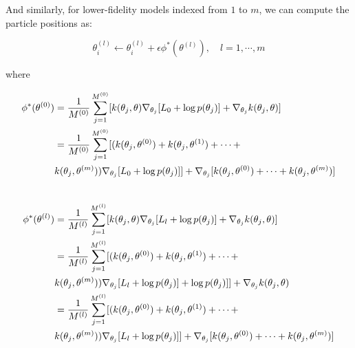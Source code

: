 \documentclass[12pt]{article}
\renewcommand{\[}{\left[}
\renewcommand{\]}{\right]}
\renewcommand{\(}{\left(}
\renewcommand{\)}{\right)}
\newcommand{\grad}[1]{\nabla #1}
\begin{document}
And similarly, for lower-fidelity models indexed from $1$ to $m$, we can compute the particle positions as:

\begin{equation*}
    \theta^{(l)}_i \leftarrow \theta^{(l)}_i + \epsilon \phi^{\ast}(\theta^{(l)}), \quad l=1, \cdots, m
\end{equation*}

where

\begin{align}
    \phi^{\ast}(\theta^{(0)}) &= \frac{1}{M^{(0)}}\sum_{j=1}^{M^{(0)}}[k(\theta_j, \theta) \grad_{\theta_j}[L_{0} + \log p(\theta_j)] + \grad_{\theta_j} k(\theta_j, \theta)] \\
    &= \frac{1}{M^{(0)}}\sum_{j=1}^{M^{(0)}}[(k(\theta_j, \theta^{(0)})  + k(\theta_j, \theta^{(1)}) + \cdots + \nonumber\\ 
    &k(\theta_j, \theta^{(m)})) \grad_{\theta_j}[L_{0} + \log p(\theta_j)]] + \grad_{\theta_j} [k(\theta_j, \theta^{(0)}) + \cdots + k(\theta_j, \theta^{(m)})]\\ \nonumber
\end{align}

\begin{align}
    \phi^{\ast}(\theta^{(l)}) &= \frac{1}{M^{(l)}}\sum_{j=1}^{M^{(l)}}[k(\theta_j, \theta) \grad_{\theta_j}[L_{l} + \log p(\theta_j)] + \grad_{\theta_j} k(\theta_j, \theta)] \\
    &= \frac{1}{M^{(l)}}\sum_{j=1}^{M^{(l)}}[(k(\theta_j, \theta^{(0)})  + k(\theta_j, \theta^{(1)}) + \cdots + \nonumber \\
    &k(\theta_j, \theta^{(m)})) \grad_{\theta_j}[L_{l} + \log p(\theta_j)] + \log p(\theta_j)]] + \grad_{\theta_j} k(\theta_j, \theta) \nonumber \\ 
    &= \frac{1}{M^{(l)}}\sum_{j=1}^{M^{(l)}}[(k(\theta_j, \theta^{(0)})  + k(\theta_j, \theta^{(1)}) + \cdots + \nonumber\\ 
    &k(\theta_j, \theta^{(m)})) \grad_{\theta_j}[L_{l} + \log p(\theta_j)]] + \grad_{\theta_j} [k(\theta_j, \theta^{(0)}) + \cdots + k(\theta_j, \theta^{(m)})]\\ \nonumber
\end{align}
\end{document}
